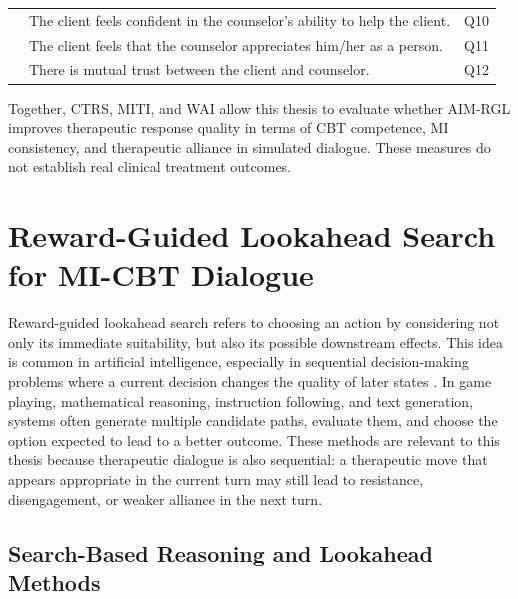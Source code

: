 \begin{table}[htbp]
\begin{tabularx}{\textwidth}{L{0.24\textwidth}Y L{0.08\textwidth}}
        
        & The client feels confident in the counselor's ability to help the client. 
        & Q10 \\
        \cmidrule(l){2-3}

        
        & The client feels that the counselor appreciates him/her as a person. 
        & Q11 \\
        \cmidrule(l){2-3}

        
        & There is mutual trust between the client and counselor. 
        & Q12 \\

        \bottomrule
    \end{tabularx}
\end{table}

Together, CTRS, MITI, and WAI allow this thesis to evaluate whether AIM-RGL improves therapeutic response quality in terms of CBT competence, MI consistency, and therapeutic alliance in simulated dialogue. These measures do not establish real clinical treatment outcomes.

\section{Reward-Guided Lookahead Search for MI-CBT Dialogue}

Reward-guided lookahead search refers to choosing an action by considering not only its immediate suitability, but also its possible downstream effects. This idea is common in artificial intelligence, especially in sequential decision-making problems where a current decision changes the quality of later states \cite{sutton2018reinforcement}. In game playing, mathematical reasoning, instruction following, and text generation, systems often generate multiple candidate paths, evaluate them, and choose the option expected to lead to a better outcome. These methods are relevant to this thesis because therapeutic dialogue is also sequential: a therapeutic move that appears appropriate in the current turn may still lead to resistance, disengagement, or weaker alliance in the next turn.

\subsection{Search-Based Reasoning and Lookahead Methods}

